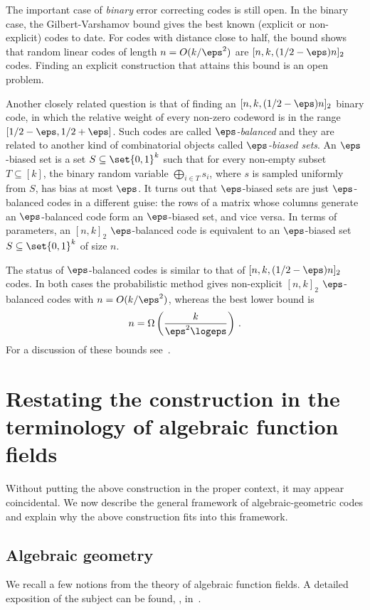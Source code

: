 The important case of \emph{binary} error correcting codes is still
open. In the binary case, the Gilbert-Varshamov bound gives the best
known (explicit or non-explicit) codes to date. For codes with
distance close to half, the bound shows that random linear codes
of length $n=O(k/\eps^2)$ are $[n,k,(1/2-\eps)n]_2$ codes. Finding
an explicit construction that attains this bound is an open problem.

Another closely related question is that of finding an
$[n,k,(1/2-\eps)n]_2$ binary code, in which the relative weight of
every non-zero codeword is in the range $[1/2-\eps,1/2+\eps]$.
Such codes are called \emph{$\eps$-balanced} and they are related to
another kind of combinatorial objects called \emph{$\eps$-biased
sets}. An $\eps$-biased set is a set $S \subseteq \set{0,1}^k$ such
that for every non-empty subset $T \subseteq [k]$, the binary random
variable $\bigoplus_{i \in T} s_i$, where $s$ is sampled uniformly
from $S$, has bias at most $\eps$. It turns out that $\eps$-biased
sets are just $\eps$-balanced codes in a different guise: the
%
%
rows of a matrix whose columns generate an $\eps$-balanced code form an $\eps$-biased set, and vice
versa. In terms of parameters, an $[n,k]_2$ $\eps$-balanced code is
equivalent to an $\eps$-biased set $S \subseteq \set{0,1}^k$ of size
$n$.

The status of $\eps$-balanced codes is similar to that of
$[n,k,(1/2-\eps)n]_2$ codes. In both cases the probabilistic
method gives non-explicit $[n,k]_2$ $\eps$-balanced codes with
$n=O({k / \eps^2})$, whereas the best lower bound is
\[
n=\Omega\left(\frac{k}{\eps^2 \logeps}\right)\,.
\] For a discussion of these
bounds see~\cite[Section 7]{AGHP:92}.

\section{Restating the construction in the terminology of algebraic function fields}
\label{sec:Restating}

Without putting the above construction in the proper context, it may
appear coincidental. We now describe the general framework of
algebraic-geometric codes and explain why the above construction
fits into this framework.

\subsection{Algebraic geometry}\label{subsec:AG-prel}
We recall a few notions from the theory of algebraic function
fields. A detailed exposition of the subject can be found, \eg,
in~\cite{S:93}.

